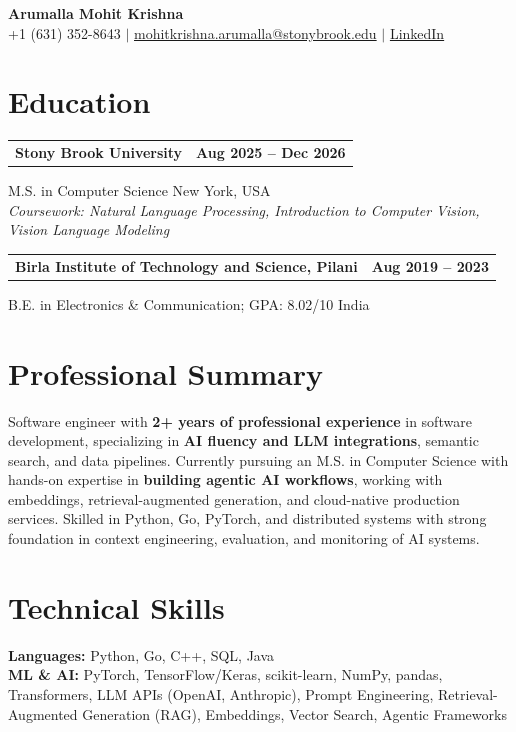 \documentclass[letterpaper,10pt]{article}
\makeatletter
\newcommand{\entry}[2]{%
  \noindent
  \begin{tabularx}{\linewidth}
    {@{}>{\raggedright\arraybackslash}X@{\hspace{6pt}}r@{}}
    \textbf{#1} & #2
  \end{tabularx}\par
}
\makeatother
\begin{document}
\begin{center}
    {\LARGE\bfseries Arumalla Mohit Krishna}\\[3pt]
    +1 (631) 352-8643 $|$
    \href{mailto:mohitkrishna.arumalla@stonybrook.edu}
    {mohitkrishna.arumalla@stonybrook.edu} $|$
    \href{https://linkedin.com/in/mohit-krishna-arumalla}
    {LinkedIn}
\end{center}
\vspace{-8pt}

\section{Education}

\entry
  {Stony Brook University}
  {\textbf{Aug 2025 -- Dec 2026}}

M.S. in Computer Science \hfill New York, USA\\
\textit{
Coursework: Natural Language Processing,
Introduction to Computer Vision, Vision Language Modeling
}
\vspace{3pt}

\entry
  {Birla Institute of Technology and Science, Pilani}
  {\textbf{Aug 2019 -- 2023}}

B.E. in Electronics \& Communication; GPA: 8.02/10 \hfill India
\section{Professional Summary}

Software engineer with \textbf{2+ years of professional experience} in software development, specializing in \textbf{AI fluency and LLM integrations}, semantic search, and data pipelines. Currently pursuing an M.S. in Computer Science with hands-on expertise in \textbf{building agentic AI workflows}, working with embeddings, retrieval-augmented generation, and cloud-native production services. Skilled in Python, Go, PyTorch, and distributed systems with strong foundation in context engineering, evaluation, and monitoring of AI systems.
\section{Technical Skills}

\textbf{Languages:}
Python, Go, C++, SQL, Java\\

\textbf{ML \& AI:}
PyTorch, TensorFlow/Keras, scikit-learn, NumPy, pandas,
Transformers, LLM APIs (OpenAI, Anthropic), Prompt Engineering,
Retrieval-Augmented Generation (RAG), Embeddings,
Vector Search, Agentic Frameworks\\
\end{document}
